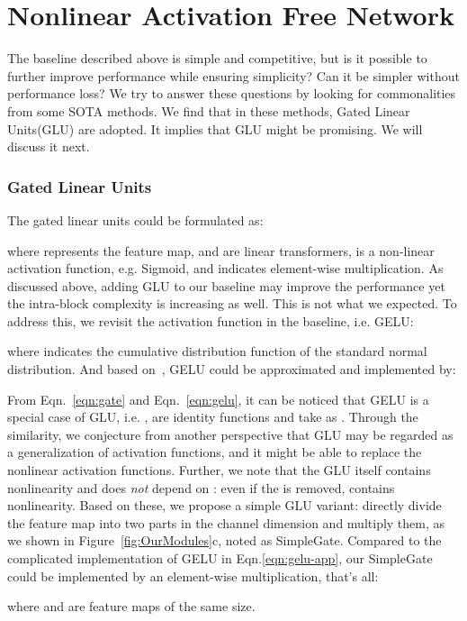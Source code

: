 \documentclass[runningheads]{llncs}
\begin{document}
\section{Nonlinear Activation Free Network}
The baseline described above is simple and competitive, but is it possible to further improve performance while ensuring simplicity?
Can it be simpler without performance loss? 
We try to answer these questions by looking for commonalities from some SOTA methods\cite{tu2022maxim,zamir2021restormer,liang2022vrt,hua2022transformer}. We find that in these methods, Gated Linear Units\cite{dauphin2017language}(GLU) are adopted. It implies that GLU might be promising. We will discuss it next.
\subsubsection{Gated Linear Units}
The gated linear units could be formulated as:

where  represents the feature map,  and  are linear transformers,  is a non-linear activation function, e.g. Sigmoid, and  indicates element-wise multiplication. As discussed above, adding GLU to our baseline may improve the performance yet the intra-block complexity is increasing as well. This is not what we expected. To address this, we revisit the activation function in the baseline, i.e. GELU\cite{hendrycks2016gaussian}:

 where  indicates the cumulative distribution function of the standard normal distribution. And based on~\cite{hendrycks2016gaussian}, GELU could be approximated and implemented by:
 
From Eqn.~\ref{eqn:gate} and Eqn.~\ref{eqn:gelu}, it can be noticed that GELU is a special case of GLU, i.e. ,  are identity functions and take  as . 
Through the similarity, we conjecture from another perspective that GLU may be regarded as a generalization of activation functions, and it might be able to replace the nonlinear activation functions.
Further, we note that the GLU itself contains nonlinearity and does \emph{not} depend on : even if the  is removed,  contains nonlinearity. Based on these, we propose a simple GLU variant: directly divide the feature map into two parts in the channel dimension and multiply them, as we shown in Figure~\ref{fig:OurModules}c, noted as SimpleGate. Compared to the complicated implementation of GELU in Eqn.\ref{eqn:gelu-app}, our SimpleGate could be implemented by an element-wise multiplication, that's all:

where  and  are feature maps of the same size. 
\end{document}
